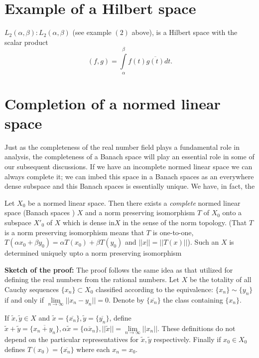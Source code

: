 \section{Example of a Hilbert space}\label{chap1:sec8}

$L_2 (\alpha, \beta): L_2 (\alpha, \beta)$ (see example $(2)$
above), is a Hilbert space with the scalar product 
$$
(f, g) = \int\limits_\alpha^\beta f(t) \overline{g(t)} dt. 
$$

\section{Completion of a normed linear space}\label{chap1:sec9}

Just as the completeness of the real number field plays a fundamental
role in analysis, the completeness of a Banach space will play an
essential role in some of our subsequent discussions. If we have an
incomplete normed linear space we can always complete it; we can imbed
this space in a Banach spaces as an everywhere dense subspace and this
Banach spaces is essentially unique. We have, in fact, the 

\begin{theorem*}%
 Let $X_0$ be a normed linear space. Then there exists a {\em
  complete} normed linear space (Banach spaces ) $X$ and a norm
 preserving isomorphism $T$ of $X_0$ onto a subspace $X'_0$ of $X$
 which is dense in\pageoriginale $X$ in the sense of the norm topology. (That $T$
 is a norm preserving isomorphism means that $T$ is one-to-one,
 $T(\alpha x_0 + \beta y_0) = \alpha T(x_0) + \beta T(y_0)$ and $|| x
 || = || T(x) ||$). Such an $X$ is determined uniquely upto a norm
 preserving isomorphism 
\end{theorem*}

\noindent
{\bf Sketch of the proof:} The proof follows the same idea as that
utilized for defining the real numbers from the rational numbers. Let
$X$ be the totality of all Cauchy sequences $\{x_n\} \subset X_0$
classified according to the equivalence: $\{ x_n\} \sim \{y_n\}$ if
and only if $\lim \limits_{n \to \infty} || x_n - y_n || = 0$. Denote
by $\{\overline{x_n}\}$ the class containing $\{x_n\}$. 

If $\tilde{x}, \tilde{y} \in X$ and $\tilde{x} = \{\overline{ x_n}\},
\tilde{y} = \{\overline{y_n}\}$, define $\tilde{x} + \tilde{y} =
\{\overline{x_n + y_n}\}, \alpha \tilde{x} = \{\overline{\alpha
 x_n}\}, || \tilde{x} || = \lim \limits_{n \to \infty} || x_n
||$. These definitions do not depend on the particular representatives
for $\tilde{x}, \tilde{y}$ respectively. Finally if $x_0 \in X_0$
defines $T(x_0) = \{\overline{x_n}\}$ where each $x_n = x_0$. 


